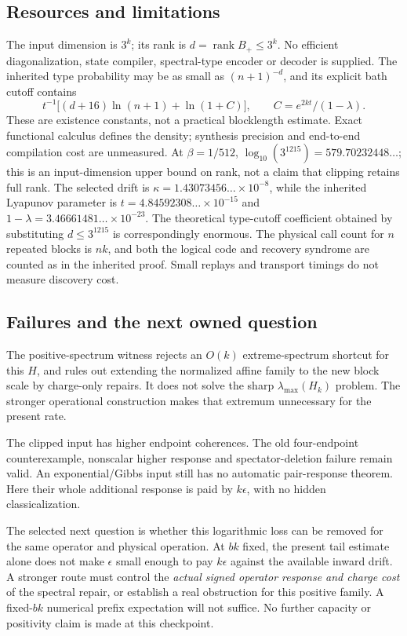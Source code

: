 \documentclass[11pt]{article}
\newcommand{\rank}{\operatorname{rank}}
\begin{document}
\subsection{Resources and limitations}

The input dimension is \(3^k\); its rank is \(d=\rank B_+\le3^k\).
No efficient diagonalization, state compiler, spectral-type encoder or
decoder is supplied. The inherited type probability may be as small as
\((n+1)^{-d}\), and its explicit bath cutoff contains
\[
 t^{-1}\big[(d+16)\ln(n+1)+\ln(1+C)\big],
 \qquad C=e^{2kt}/(1-\lambda).
\]
These are existence constants, not a practical blocklength estimate.
Exact functional calculus defines the density; synthesis precision and
end-to-end compilation cost are unmeasured.
At \(\beta=1/512\), \(\log_{10}(3^{1215})=579.70232448\ldots\);
this is an input-dimension upper bound on rank, not a claim that clipping
retains full rank. The selected drift is
\(\kappa=1.43073456\ldots\times10^{-8}\), while the inherited
Lyapunov parameter is \(t=4.84592308\ldots\times10^{-15}\) and
\(1-\lambda=3.46661481\ldots\times10^{-23}\).
The theoretical type-cutoff coefficient obtained by substituting
\(d\le3^{1215}\) is correspondingly enormous.
The physical call count for \(n\) repeated blocks is \(nk\), and both
the logical code and recovery syndrome are counted as in the inherited
proof. Small replays and transport timings do not measure discovery cost.

\subsection{Failures and the next owned question}

The positive-spectrum witness rejects an \(O(k)\) extreme-spectrum shortcut
for this \(H\), and rules out extending the normalized affine family to the
new block scale by charge-only repairs. It does not solve the sharp
\(\lambda_{\max}(H_k)\) problem. The stronger operational construction makes
that extremum unnecessary for the present rate.

The clipped input has higher endpoint coherences. The old four-endpoint
counterexample, nonscalar higher response and spectator-deletion failure
remain valid. An exponential/Gibbs input still has no automatic
pair-response theorem. Here their whole additional response is paid by
\(k\epsilon\), with no hidden classicalization.

The selected next question is whether this logarithmic loss can be removed
for the same operator and physical operation. At \(bk\) fixed, the present
tail estimate alone does not make \(\epsilon\) small enough to pay
\(k\epsilon\) against the available inward drift. A stronger route must
control the \emph{actual signed operator response and charge cost} of the
spectral repair, or establish a real obstruction for this positive family.
A fixed-\(bk\) numerical prefix expectation will not suffice.
No further capacity or positivity claim is made at this checkpoint.
\end{document}
